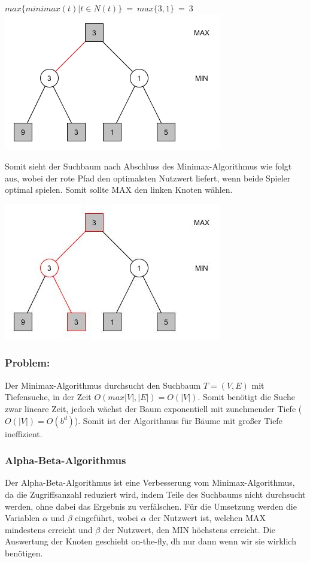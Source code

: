\begin{center}
	$max\{minimax(t) | t \in N(t)\} ~=~ max\{3,1\} ~=~ 3$
	\includegraphics[width = 7 cm]{chapters/minimax/jpg/Graph-Minmax3.jpg}
\end{center}

Somit sieht der Suchbaum nach Abschluss des Minimax-Algorithmus wie folgt aus, wobei der rote Pfad den optimalsten Nutzwert liefert, wenn beide Spieler optimal spielen. Somit sollte MAX den linken Knoten wählen.

\begin{center}
	\includegraphics[width = 7 cm]{chapters/minimax/jpg/Graph-Minmax4.jpg}
\end{center}

\vskip 60pt



\subsubsection*{Problem:} Der Minimax-Algorithmus durchsucht den Suchbaum $T=(V, E)$ mit Tiefensuche, in der Zeit $O(max {|V|, |E|}) = O(|V|)$. Somit benötigt die Suche zwar lineare Zeit, jedoch wächst der Baum exponentiell mit zunehmender Tiefe ($O(|V|)=O(b^d)$). Somit ist der Algorithmus für Bäume mit großer Tiefe ineffizient.


\newpage

\subsubsection*{Alpha-Beta-Algorithmus}
 Der Alpha-Beta-Algorithmus ist eine Verbesserung vom Minimax-Algorithmus, da die Zugriffsanzahl reduziert wird, indem Teile des Suchbaums nicht durchsucht werden, ohne dabei das Ergebnis zu verfälschen. Für die Umsetzung werden die Variablen $\alpha$ und $\beta$ eingeführt, wobei $\alpha$ der Nutzwert ist, welchen MAX mindestens erreicht und $\beta$ der Nutzwert, den MIN höchstens erreicht. Die Auswertung der Knoten geschieht on-the-fly, dh nur dann wenn wir sie wirklich benötigen. \\

